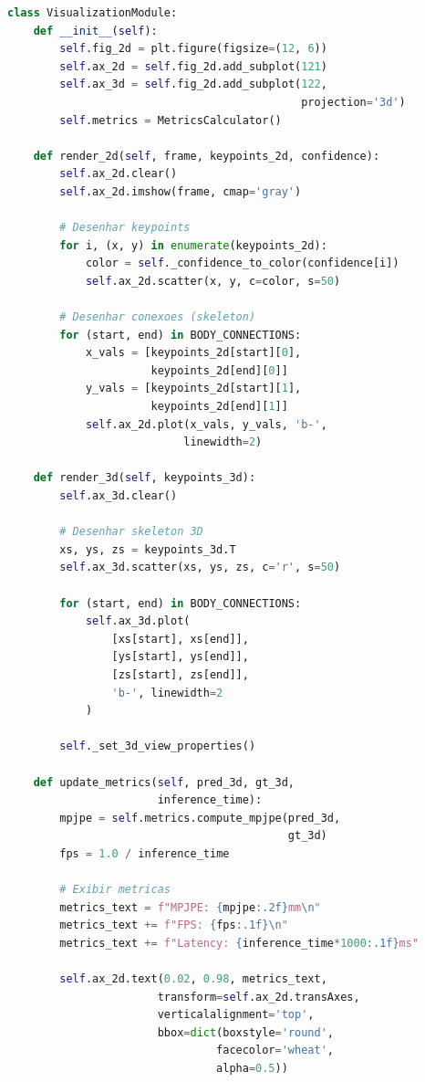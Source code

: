 \documentclass[12pt, a4paper]{article}
\begin{document}
\begin{lstlisting}[language=Python, caption=Módulo 4 - Visualização]
class VisualizationModule:
    def __init__(self):
        self.fig_2d = plt.figure(figsize=(12, 6))
        self.ax_2d = self.fig_2d.add_subplot(121)
        self.ax_3d = self.fig_2d.add_subplot(122, 
                                             projection='3d')
        self.metrics = MetricsCalculator()
        
    def render_2d(self, frame, keypoints_2d, confidence):
        self.ax_2d.clear()
        self.ax_2d.imshow(frame, cmap='gray')
        
        # Desenhar keypoints
        for i, (x, y) in enumerate(keypoints_2d):
            color = self._confidence_to_color(confidence[i])
            self.ax_2d.scatter(x, y, c=color, s=50)
        
        # Desenhar conexoes (skeleton)
        for (start, end) in BODY_CONNECTIONS:
            x_vals = [keypoints_2d[start][0], 
                      keypoints_2d[end][0]]
            y_vals = [keypoints_2d[start][1], 
                      keypoints_2d[end][1]]
            self.ax_2d.plot(x_vals, y_vals, 'b-', 
                           linewidth=2)
    
    def render_3d(self, keypoints_3d):
        self.ax_3d.clear()
        
        # Desenhar skeleton 3D
        xs, ys, zs = keypoints_3d.T
        self.ax_3d.scatter(xs, ys, zs, c='r', s=50)
        
        for (start, end) in BODY_CONNECTIONS:
            self.ax_3d.plot(
                [xs[start], xs[end]],
                [ys[start], ys[end]],
                [zs[start], zs[end]],
                'b-', linewidth=2
            )
        
        self._set_3d_view_properties()
    
    def update_metrics(self, pred_3d, gt_3d, 
                       inference_time):
        mpjpe = self.metrics.compute_mpjpe(pred_3d, 
                                           gt_3d)
        fps = 1.0 / inference_time
        
        # Exibir metricas
        metrics_text = f"MPJPE: {mpjpe:.2f}mm\n"
        metrics_text += f"FPS: {fps:.1f}\n"
        metrics_text += f"Latency: {inference_time*1000:.1f}ms"
        
        self.ax_2d.text(0.02, 0.98, metrics_text,
                       transform=self.ax_2d.transAxes,
                       verticalalignment='top',
                       bbox=dict(boxstyle='round', 
                                facecolor='wheat', 
                                alpha=0.5))


\end{lstlisting}
\end{document}

